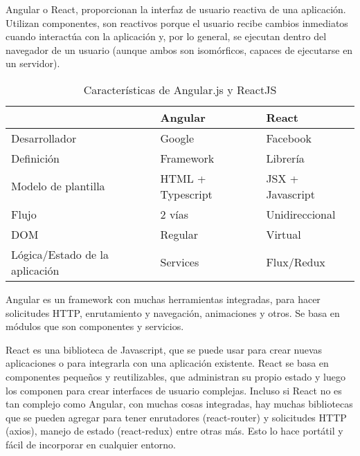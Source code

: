 Angular o React, proporcionan la interfaz de usuario reactiva de una aplicación. Utilizan componentes, son reactivos porque el usuario recibe cambios inmediatos cuando interactúa con la aplicación y, por lo general, se ejecutan dentro del navegador de un usuario (aunque ambos son isomórficos, capaces de ejecutarse en un servidor).
\vspace{0.8cm}

\begin{table}[H]
  \renewcommand{\arraystretch}{1.5}
  \centering
  \scriptsize
  \begin{tabular}{ |p{2cm}||p{5cm}|p{5cm}|  }
    \hline
      & Angular
      & React \\
    \hline
    Desarrollador
      & Google
      & Facebook \\
    \hline
    Definición
      & Framework
      & Librería \\
    \hline
    Modelo de plantilla
      & HTML + Typescript
      & JSX + Javascript \\
    \hline
    Flujo
      & 2 vías
      & Unidireccional \\
    \hline
    DOM
      & Regular
      & Virtual \\
    \hline
    Lógica/Estado de la aplicación
      & Services
      & Flux/Redux \\
    \hline
  \end{tabular}
  \caption{Características de Angular.js y ReactJS}
\end{table}
\vspace{0.8cm}

Angular es un framework con muchas herramientas integradas, para hacer solicitudes HTTP, enrutamiento y navegación, animaciones y otros. Se basa en módulos que son componentes y servicios.
\vspace{0.8cm}

React es una biblioteca de Javascript, que se puede usar para crear nuevas aplicaciones o para integrarla con una aplicación existente. React se basa en componentes pequeños y reutilizables, que administran su propio estado y luego los componen para crear interfaces de usuario complejas. Incluso si React no es tan complejo como Angular, con muchas cosas integradas, hay muchas bibliotecas que se pueden agregar para tener enrutadores (react-router) y solicitudes HTTP (axios), manejo de estado (react-redux) entre otras más. Esto lo hace portátil y fácil de incorporar en cualquier entorno.